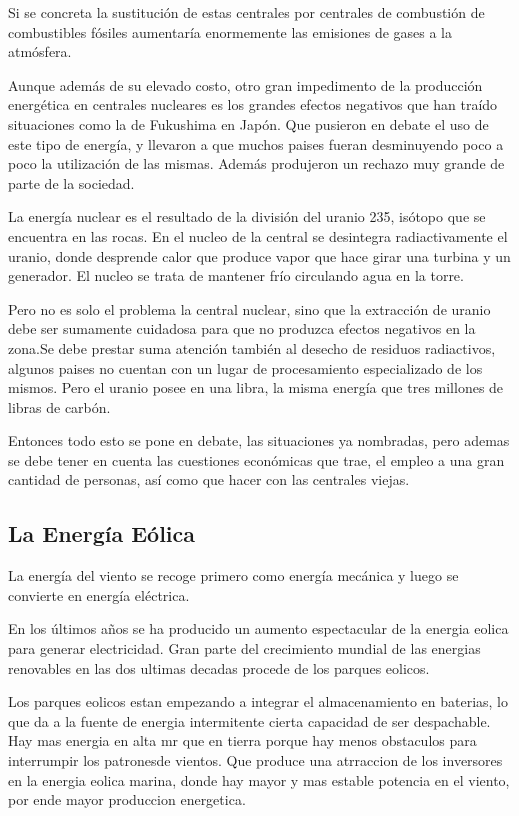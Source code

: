\documentclass[runningheads]{llncs}
\begin{document}
Si se concreta la sustitución de estas centrales por centrales de combustión de combustibles fósiles aumentaría enormemente las emisiones de gases a la atmósfera.

Aunque además de su elevado costo, otro gran impedimento de la producción energética en centrales nucleares es los grandes efectos negativos que han traído situaciones como la de Fukushima en Japón. Que pusieron en debate el uso de este tipo de energía, y llevaron a que muchos paises fueran desminuyendo poco a poco la utilización de las mismas. Además produjeron un rechazo muy grande de parte de la sociedad.

La energía nuclear es el resultado de la división del uranio 235, isótopo que se encuentra en las rocas. En el nucleo de la central se desintegra radiactivamente el uranio, donde desprende calor que produce vapor que hace girar una turbina y un generador. El nucleo se trata de mantener frío circulando agua en la torre.

Pero no es solo el problema la central nuclear, sino que la extracción de uranio debe ser sumamente cuidadosa para que no produzca efectos negativos en la zona.Se debe prestar suma atención también al desecho de residuos radiactivos, algunos paises no cuentan con un lugar de procesamiento especializado de los mismos. Pero el uranio posee en una libra, la misma energía que tres millones de libras de carbón. 

Entonces todo esto se pone en debate, las situaciones ya nombradas, pero ademas se debe tener en cuenta las cuestiones económicas que trae, el empleo a una gran cantidad de personas, así como que hacer con las centrales viejas.


\subsection{La Energía Eólica}

La energía del viento se recoge primero como energía mecánica y luego se convierte en energía eléctrica.

En los últimos años se ha producido un aumento espectacular de la energia eolica para generar electricidad. Gran parte del crecimiento mundial de las energias renovables en las dos ultimas decadas procede de los parques eolicos. 

Los parques eolicos estan empezando a integrar el almacenamiento en baterias, lo que da a la fuente de energia intermitente cierta capacidad de ser despachable. Hay mas energia en alta mr que en tierra porque hay menos obstaculos para interrumpir los patronesde vientos. Que produce una atrraccion de los inversores en la energia eolica marina, donde hay mayor y mas estable potencia en el viento, por ende mayor produccion energetica.
\end{document}
